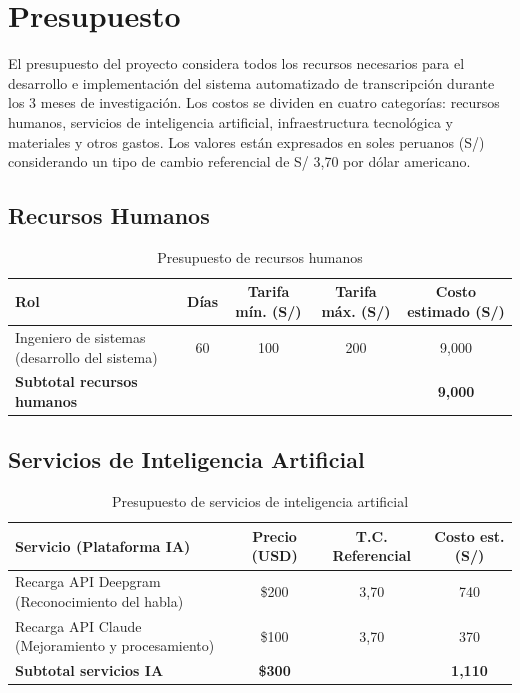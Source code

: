 \documentclass[12pt,a4paper,oneside]{article}
\begin{document}
\section{Presupuesto}

El presupuesto del proyecto considera todos los recursos necesarios para el desarrollo e implementaci\'on del sistema automatizado de transcripci\'on durante los 3 meses de investigaci\'on. Los costos se dividen en cuatro categor\'ias: recursos humanos, servicios de inteligencia artificial, infraestructura tecnol\'ogica y materiales y otros gastos. Los valores est\'an expresados en soles peruanos (S/) considerando un tipo de cambio referencial de S/ 3{,}70 por d\'olar americano.

\subsection{Recursos Humanos}

\begin{table}[H]
\centering
\caption{Presupuesto de recursos humanos}
\begin{tabular}{|p{4cm}|c|c|c|c|}
\hline
\rowcolor{gray!20}
\textbf{Rol} & \textbf{D\'ias} & \textbf{Tarifa m\'in. (S/)} & \textbf{Tarifa m\'ax. (S/)} & \textbf{Costo estimado (S/)} \\
\hline
Ingeniero de sistemas (desarrollo del sistema) & 60 & 100 & 200 & 9{,}000 \\
\hline
\textbf{Subtotal recursos humanos} & & & & \textbf{9{,}000} \\
\hline
\end{tabular}
\label{tab:presupuesto_rrhh}
\end{table}

\subsection{Servicios de Inteligencia Artificial}

\begin{table}[H]
\centering
\caption{Presupuesto de servicios de inteligencia artificial}
\begin{tabular}{|p{5.5cm}|c|c|c|}
\hline
\rowcolor{gray!20}
\textbf{Servicio (Plataforma IA)} & \textbf{Precio (USD)} & \textbf{T.C. Referencial} & \textbf{Costo est. (S/)} \\
\hline
Recarga API Deepgram (Reconocimiento del habla) & \$200 & 3{,}70 & 740 \\
\hline
Recarga API Claude (Mejoramiento y procesamiento) & \$100 & 3{,}70 & 370 \\
\hline
\textbf{Subtotal servicios IA} & \textbf{\$300} & & \textbf{1{,}110} \\
\hline
\end{tabular}
\label{tab:presupuesto_ia}
\end{table}
\end{document}
